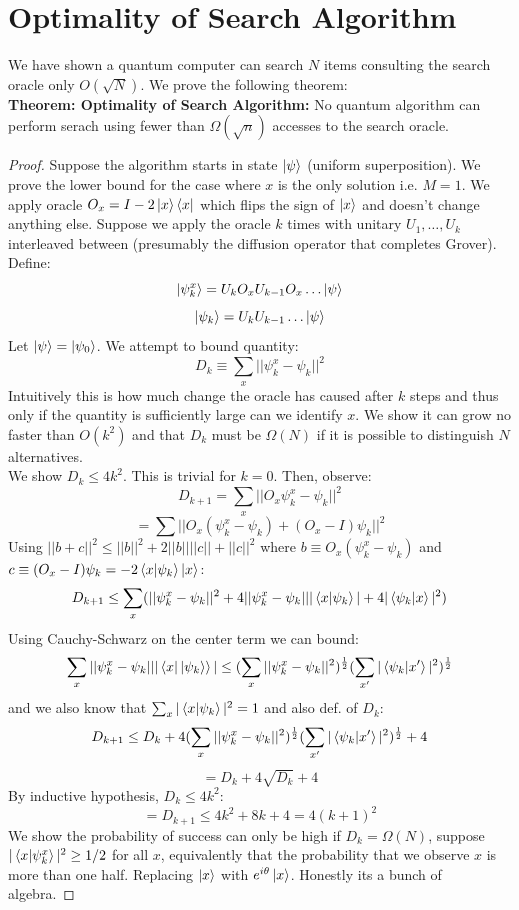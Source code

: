 \documentclass{article}
\begin{document}
\section{Optimality of Search Algorithm}
We have shown a quantum computer can search $N$ items consulting the search oracle only $O(\sqrt{N})$. We prove the following theorem:\\
\textbf{Theorem: Optimality of Search Algorithm:} No quantum algorithm can perform serach using fewer than $\Omega(\sqrt{n})$ accesses to the search oracle.\\
\begin{proof}
	Suppose the algorithm starts in state $\ket{\psi}$ (uniform superposition). We prove the lower bound for the case where $x$ is the only solution i.e. $M=1$. We apply oracle $O_x = I - 2\ket{x}\bra{x}$ which flips the sign of $\ket{x}$ and doesn't change anything else. Suppose we apply the oracle $k$ times with unitary $U_1, \dots, U_k$ interleaved between (presumably the diffusion operator that completes Grover). Define:
	$$\ket{\psi_k^x} = U_k O_x U_{k-1} O_x \dots \ket{\psi}$$
	$$\ket{\psi_k} = U_k U_{k-1}\dots\ket{\psi}$$
Let $\ket{\psi} = \ket{\psi_0}$. We attempt to bound quantity:
$$D_k \equiv \sum_x ||\psi_k^x - \psi_k||^2$$
Intuitively this is how much change the oracle has caused after $k$ steps and thus only if the quantity is sufficiently large can we identify $x$. We show it can grow no faster than $O(k^2)$ and that $D_k$ must be $\Omega(N)$ if it is possible to distinguish $N$ alternatives. \\
We show $D_k \leq 4k^2$. This is trivial for $k=0$. Then, observe:
$$D_{k+1} = \sum_x ||O_x \psi_k^x - \psi_k||^2$$
$$= \sum || O_x(\psi_k^x - \psi_k) + (O_x -I)\psi_k||^2$$
Using $||b+c||^2 \leq ||b||^2 + 2||b||||c|| + ||c||^2$ where $b \equiv O_x(\psi_k^x - \psi_k)$ and $c \equiv (O_x - I)\psi_k = -2\braket{x|\psi_k}\ket{x}$:
$$D_{k+1} \leq \sum_x (||\psi_k^x - \psi_k||^2 + 4||\psi_k^x - \psi_k|| |\braket{x|\psi_k}| + 4|\braket{\psi_k|x}|^2)$$
Using Cauchy-Schwarz on the center term we can bound:
$$\sum_x|| \psi_k^x - \psi_k|| |\braket{x|\ket{\psi_k}}| \leq (\sum_x ||\psi_k^x - \psi_k||^2)^\frac12 (\sum_{x'} |\braket{\psi_k |x'}|^2)^\frac12$$
and we also know that $\sum_x |\braket{x|\psi_k}|^2 = 1$ and also def. of $D_k$:
$$ D_{k+1} \leq D_k + 4(\sum_x || \psi_k^x - \psi_k||^2)^\frac12 (\sum_{x'} |\braket{\psi_k|x'}|^2)^\frac12 + 4$$
$$ = D_k + 4 \sqrt{D_k} + 4$$
By inductive hypothesis, $D_k \leq 4k^2:$
$$= D_{k+1} \leq 4k^2 + 8k + 4 = 4(k+1)^2$$
We show the probability of success can only be high if $D_k = \Omega(N)$, suppose $|\braket{x|\psi_k^x}|^2 \geq 1/2$ for all $x$, equivalently that the probability that we observe $x$ is more than one half. Replacing $\ket{x}$ with $e^{i\theta}\ket{x}$. Honestly its a bunch of algebra.


\end{proof}
\end{document}
